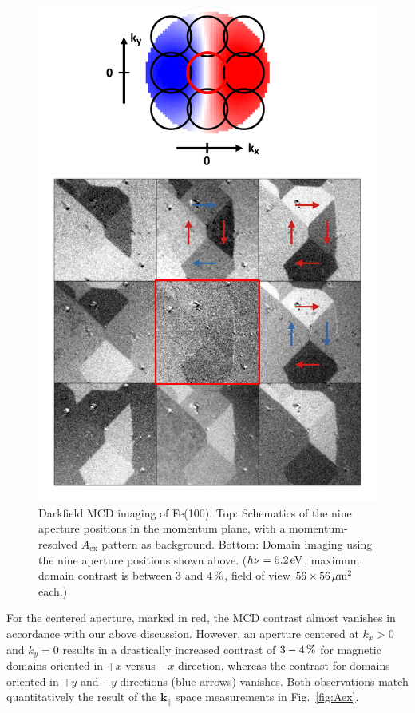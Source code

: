 \documentclass[prl,twocolumn,floatfix,superscriptaddress,aps]{revtex4-2}
\renewcommand{\vec}[1]{\boldsymbol{#1}}
\begin{document}
\begin{figure}
    \centering
    \includegraphics[width = 0.7\columnwidth]{FePaper9FelderSchema.pdf}
    \caption{Darkfield MCD imaging of Fe(100). Top: Schematics of the nine aperture positions in the momentum plane, with a momentum-resolved $A_{\mathrm{ex}}$ pattern as background. Bottom: Domain imaging using the nine aperture positions shown above. ($h \nu = \unit[5.2]{eV}$, 
    maximum domain contrast is between 3 and $\unit[4]{\%}$, field of view $\unit[56 \times 56]{\mu m^2}$ each.)}
    \label{fig:Imaging}
\end{figure}

For the centered aperture, marked in red, the MCD contrast almost vanishes in accordance with our above discussion. However, an aperture centered at $k_x > 0$ and $k_y = 0$ results in a drastically increased contrast of $\unit[3-4]{\%}$ for magnetic domains oriented in $+x$ versus $-x$ direction, whereas the contrast for domains oriented in $+y$ and $-y$ directions (blue arrows) vanishes. Both observations match quantitatively the result of the $\vec{k}_{\parallel}$ space measurements in Fig.~\ref{fig:Aex}. 
\end{document}
